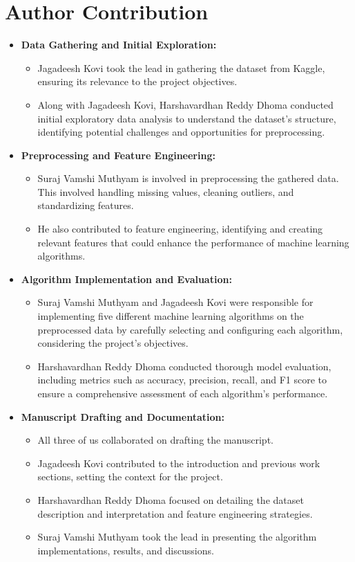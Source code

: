 \documentclass[11pt,a4paper]{article}
\begin{document}
\section{Author Contribution} %
\begin{itemize}
  \item \textbf{Data Gathering and Initial Exploration:}
    \begin{itemize}
      \item Jagadeesh Kovi took the lead in gathering the dataset from Kaggle, ensuring its relevance to the project objectives.
      \item Along with Jagadeesh Kovi, Harshavardhan Reddy Dhoma conducted initial exploratory data analysis to understand the dataset's structure, identifying potential challenges and opportunities for preprocessing.
    \end{itemize}
  
  \item \textbf{Preprocessing and Feature Engineering:}
    \begin{itemize}
      \item Suraj Vamshi Muthyam is involved in preprocessing the gathered data. This involved handling missing values, cleaning outliers, and standardizing features.
      \item He also contributed to feature engineering, identifying and creating relevant features that could enhance the performance of machine learning algorithms.
    \end{itemize}
  
  \item \textbf{Algorithm Implementation and Evaluation:}
    \begin{itemize}
      \item Suraj Vamshi Muthyam and Jagadeesh Kovi were responsible for implementing five different machine learning algorithms on the preprocessed data by carefully selecting and configuring each algorithm, considering the project's objectives.
      \item Harshavardhan Reddy Dhoma conducted thorough model evaluation, including metrics such as accuracy, precision, recall, and F1 score to ensure a comprehensive assessment of each algorithm's performance.
    \end{itemize}
  
  \item \textbf{Manuscript Drafting and Documentation:}
    \begin{itemize}
      \item All three of us collaborated on drafting the manuscript.
      \item Jagadeesh Kovi contributed to the introduction and previous work sections, setting the context for the project.
      \item Harshavardhan Reddy Dhoma focused on detailing the dataset description and interpretation and feature engineering strategies.
      \item Suraj Vamshi Muthyam took the lead in presenting the algorithm implementations, results, and discussions.
    \end{itemize}
\end{itemize}


\cite{reference5}
\cite{reference6}
\cite{reference7}
\cite{article}
\cite{article2}
\end{document}
